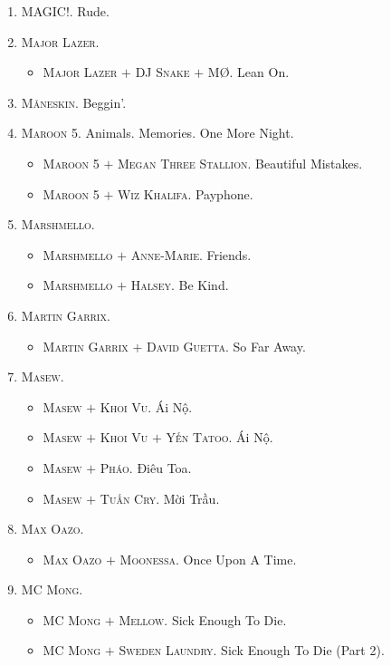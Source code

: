 \documentclass{article}
\numberwithin{equation}{section}
\begin{document}
\begin{enumerate}
	\item \textsc{MAGIC!.} Rude.
	\item \textsc{Major Lazer.}
	\begin{itemize}
		\item \textsc{Major Lazer $+$ DJ Snake $+$ M\O.} Lean On.
	\end{itemize}
	\item \textsc{M\r{a}neskin.} Beggin'.
	\item \textsc{Maroon 5.} Animals. Memories. One More Night.
	\begin{itemize}
		\item \textsc{Maroon 5 $+$ Megan Three Stallion.} Beautiful Mistakes.
		\item \textsc{Maroon 5 $+$ Wiz Khalifa.} Payphone.
	\end{itemize}
	\item \textsc{Marshmello.}
	\begin{itemize}
		\item \textsc{Marshmello $+$ Anne-Marie.} Friends.
		\item \textsc{Marshmello $+$ Halsey.} Be Kind.
	\end{itemize}
	\item \textsc{Martin Garrix.}
	\begin{itemize}
		\item \textsc{Martin Garrix $+$ David Guetta.} So Far Away.
	\end{itemize}
	\item \textsc{Masew.}
	\begin{itemize}
		\item \textsc{Masew $+$ Khoi Vu.} Ái Nộ.
		\item \textsc{Masew $+$ Khoi Vu $+$ Yến Tatoo.} Ái Nộ.
		\item \textsc{Masew $+$ Pháo.} Điêu Toa.
		\item \textsc{Masew $+$ Tuấn Cry.} Mời Trầu.
	\end{itemize}
	\item \textsc{Max Oazo.}
	\begin{itemize}
		\item \textsc{Max Oazo $+$ Moonessa.} Once Upon A Time.
	\end{itemize}
	\item \textsc{MC Mong.}
	\begin{itemize}
		\item \textsc{MC Mong $+$ Mellow.} Sick Enough To Die.
		\item \textsc{MC Mong $+$ Sweden Laundry.} Sick Enough To Die (Part 2).

\end{itemize}
\end{enumerate}
\end{document}
